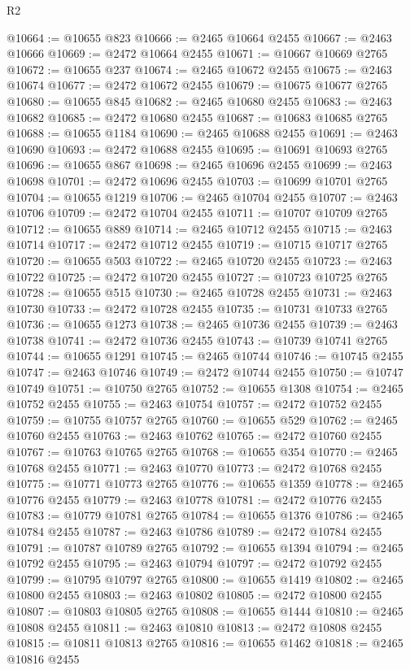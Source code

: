 \begin{lexlean}{R2}
\begin{coremodule}
@10664 := @10655 @823
@10666 := @2465 @10664 @2455
@10667 := @2463 @10666
@10669 := @2472 @10664 @2455
@10671 := @10667 @10669 @2765
@10672 := @10655 @237
@10674 := @2465 @10672 @2455
@10675 := @2463 @10674
@10677 := @2472 @10672 @2455
@10679 := @10675 @10677 @2765
@10680 := @10655 @845
@10682 := @2465 @10680 @2455
@10683 := @2463 @10682
@10685 := @2472 @10680 @2455
@10687 := @10683 @10685 @2765
@10688 := @10655 @1184
@10690 := @2465 @10688 @2455
@10691 := @2463 @10690
@10693 := @2472 @10688 @2455
@10695 := @10691 @10693 @2765
@10696 := @10655 @867
@10698 := @2465 @10696 @2455
@10699 := @2463 @10698
@10701 := @2472 @10696 @2455
@10703 := @10699 @10701 @2765
@10704 := @10655 @1219
@10706 := @2465 @10704 @2455
@10707 := @2463 @10706
@10709 := @2472 @10704 @2455
@10711 := @10707 @10709 @2765
@10712 := @10655 @889
@10714 := @2465 @10712 @2455
@10715 := @2463 @10714
@10717 := @2472 @10712 @2455
@10719 := @10715 @10717 @2765
@10720 := @10655 @503
@10722 := @2465 @10720 @2455
@10723 := @2463 @10722
@10725 := @2472 @10720 @2455
@10727 := @10723 @10725 @2765
@10728 := @10655 @515
@10730 := @2465 @10728 @2455
@10731 := @2463 @10730
@10733 := @2472 @10728 @2455
@10735 := @10731 @10733 @2765
@10736 := @10655 @1273
@10738 := @2465 @10736 @2455
@10739 := @2463 @10738
@10741 := @2472 @10736 @2455
@10743 := @10739 @10741 @2765
@10744 := @10655 @1291
@10745 := @2465 @10744
@10746 := @10745 @2455
@10747 := @2463 @10746
@10749 := @2472 @10744 @2455
@10750 := @10747 @10749
@10751 := @10750 @2765
@10752 := @10655 @1308
@10754 := @2465 @10752 @2455
@10755 := @2463 @10754
@10757 := @2472 @10752 @2455
@10759 := @10755 @10757 @2765
@10760 := @10655 @529
@10762 := @2465 @10760 @2455
@10763 := @2463 @10762
@10765 := @2472 @10760 @2455
@10767 := @10763 @10765 @2765
@10768 := @10655 @354
@10770 := @2465 @10768 @2455
@10771 := @2463 @10770
@10773 := @2472 @10768 @2455
@10775 := @10771 @10773 @2765
@10776 := @10655 @1359
@10778 := @2465 @10776 @2455
@10779 := @2463 @10778
@10781 := @2472 @10776 @2455
@10783 := @10779 @10781 @2765
@10784 := @10655 @1376
@10786 := @2465 @10784 @2455
@10787 := @2463 @10786
@10789 := @2472 @10784 @2455
@10791 := @10787 @10789 @2765
@10792 := @10655 @1394
@10794 := @2465 @10792 @2455
@10795 := @2463 @10794
@10797 := @2472 @10792 @2455
@10799 := @10795 @10797 @2765
@10800 := @10655 @1419
@10802 := @2465 @10800 @2455
@10803 := @2463 @10802
@10805 := @2472 @10800 @2455
@10807 := @10803 @10805 @2765
@10808 := @10655 @1444
@10810 := @2465 @10808 @2455
@10811 := @2463 @10810
@10813 := @2472 @10808 @2455
@10815 := @10811 @10813 @2765
@10816 := @10655 @1462
@10818 := @2465 @10816 @2455

\end{coremodule}
\end{lexlean}
